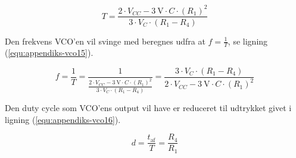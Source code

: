 \begin{equation}
\label{equ:appendiks-vco14b}
T = \frac{2 \cdot V_{CC} - 3~\mathrm{V} \cdot C \cdot (R_1)^2}{3 \cdot V_C \cdot (R_1 - R_4)}
\end{equation}

Den frekvens VCO'en vil svinge med beregnes udfra at $f = \frac{1}{T}$, se ligning (\ref{equ:appendiks-vco15}).

\begin{equation}
\label{equ:appendiks-vco15}
f = \frac{1}{T} = \frac{1}{\frac{2 \cdot V_{CC} - 3~\mathrm{V} \cdot C \cdot (R_1)^2}{3 \cdot V_C \cdot (R_1 - R_4)}} = \frac{3 \cdot V_C \cdot (R_1 - R_4)}{2 \cdot V_{CC} - 3~\mathrm{V} \cdot C \cdot (R_1)^2}
\end{equation}

Den duty cycle som VCO'ens output vil have er reduceret til udtrykket givet i ligning (\ref{equ:appendiks-vco16}).

\begin{equation}
\label{equ:appendiks-vco16}
d = \frac{t_{\mathrm{af}}}{T} = \frac{R_4}{R_1}
\end{equation}